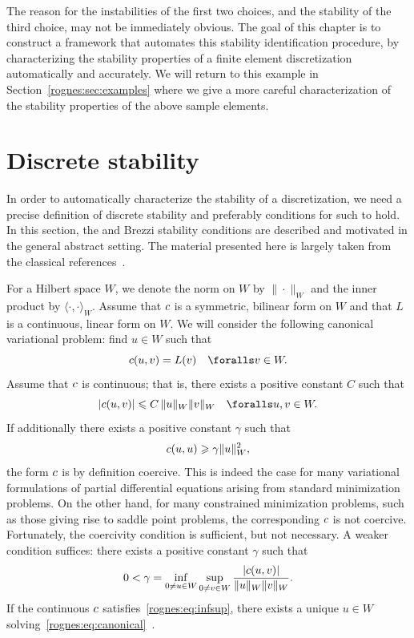 The reason for the instabilities of the first two choices, and the
stability of the third choice, may not be immediately obvious. The
goal of this chapter is to construct a framework that automates this
stability identification procedure, by characterizing the stability
properties of a finite element discretization automatically and
accurately.  We will return to this example in
Section~\ref{rognes:sec:examples} where we give a more careful
characterization of the stability properties of the above sample
elements.

\section{Discrete stability}

In order to automatically characterize the stability of a
discretization, we need a precise definition of discrete stability and
preferably conditions for such to hold. In this section,
the \babuska{} and Brezzi stability conditions are described and
motivated in the general abstract setting. The material presented here
is largely taken from the classical references~\citep{Babuvska1972/73,
Brezzi1974, BrezziFortin1991}.

For a Hilbert space $W$, we denote the norm on $W$ by
$\|\cdot\|_{W}$ and the inner product by $\langle \cdot, \cdot
\rangle_{W}$. Assume that $c$ is a symmetric, bilinear
form on $W$ and that $L$ is a continuous, linear form on $W$. We will
consider the following canonical variational problem: find $u \in W$
such that
\begin{equation}
  \label{rognes:eq:canonical}
  \rognesc(u, v) = L(v) \quad \foralls v \in W.
\end{equation}
Assume that $c$ is continuous; that is, there exists a positive
constant $C$ such that
\begin{equation}
  |\rognesc(u, v)| \leqslant C \, \|u\|_{W} \|v\|_{W}
  \quad \foralls u, v \in W.
\end{equation}
If additionally there exists a positive constant $\gamma$ such that
\begin{equation}
  c(u, u) \geqslant \gamma \|u\|_{W}^2,
\end{equation}
the form $c$ is by definition coercive. This is indeed the case
for many variational formulations of partial differential equations
arising from standard minimization problems. On the other hand, for
many constrained minimization problems, such as those giving rise to
saddle point problems, the corresponding $c$ is not coercive.
Fortunately, the coercivity condition is sufficient, but not
necessary. A weaker condition suffices: there exists a positive
constant $\gamma$ such that
\begin{equation}
  \label{rognes:eq:infsup}
  0 < \gamma = \inf_{0 \not = u \in W} \sup_{0 \not = v \in W}
  \frac{|c(u,  v)|}{\|u\|_{W}\|v\|_{W}}.
\end{equation}
If the continuous $c$ satisfies~\eqref{rognes:eq:infsup}, there
exists a unique $u \in W$
solving~\eqref{rognes:eq:canonical}~\citep{Babuvska1972/73}.

